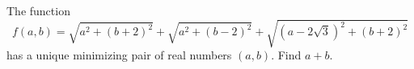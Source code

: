 The function
\[
f(a,b)=\sqrt{a^2+(b+2)^2}+\sqrt{a^2+(b-2)^2}
+\sqrt{(a-2\sqrt3)^2+(b+2)^2}
\]
has a unique minimizing pair of real numbers $(a,b)$. Find $a+b$.
